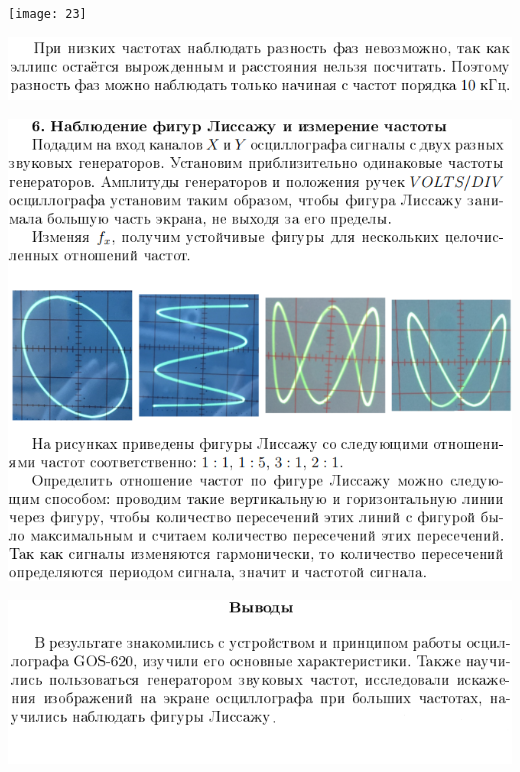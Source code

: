\documentclass[a4paper,12pt]{article} %
\begin{document}
\begin{center}
\texttt{[image: 23]}
\end{center}

\begin{center}
\includegraphics{24}
\end{center}

\begin{center}
\includegraphics{25}
\end{center}

\begin{center}
\includegraphics{26}
\end{center}
\end{document}
